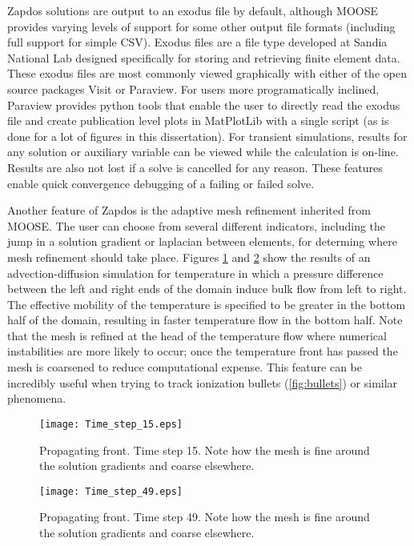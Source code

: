 Zapdos solutions are output to an exodus file by default, although MOOSE provides varying levels of support for some other output file formats (including full support for simple CSV). Exodus files are a file type developed at Sandia National Lab designed specifically for storing and retrieving finite element data. \cite{schoof1994exodus} These exodus files are most commonly viewed graphically with either of the open source packages Visit or Paraview. For users more programatically inclined, Paraview provides python tools that enable the user to directly read the exodus file and create publication level plots in MatPlotLib with a single script (as is done for a lot of figures in this dissertation). For transient simulations, results for any solution or auxiliary variable can be viewed while the calculation is on-line. Results are also not lost if a solve is cancelled for any reason. These features enable quick convergence debugging of a failing or failed solve.

Another feature of Zapdos is the adaptive mesh refinement inherited from MOOSE. The user can choose from several different indicators, including the jump in a solution gradient or laplacian between elements, for determing where mesh refinement should take place. Figures \ref{fig:step15} and \ref{fig:step49} show the results of an advection-diffusion simulation for temperature in which a pressure difference between the left and right ends of the domain induce bulk flow from left to right. The effective mobility of the temperature is specified to be greater in the bottom half of the domain, resulting in faster temperature flow in the bottom half. Note that the mesh is refined at the head of the temperature flow where numerical instabilities are more likely to occur; once the temperature front has passed the mesh is coarsened to reduce computational expense. This feature can be incredibly useful when trying to track ionization bullets (\cref{fig:bullets}) or similar phenomena.

\begin{figure}[htbp]
  \centering
  \texttt{[image: Time\_step\_15.eps]}
  \caption{Propagating front. Time step 15. Note how the mesh is fine around the solution gradients and coarse elsewhere.}
  \label{fig:step15}
\end{figure}

\begin{figure}[htbp]
  \centering
  \texttt{[image: Time\_step\_49.eps]}
  \caption{Propagating front. Time step 49. Note how the mesh is fine around the solution gradients and coarse elsewhere.}
  \label{fig:step49}
\end{figure}

